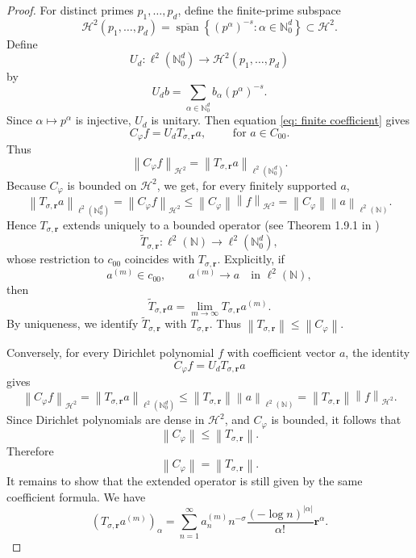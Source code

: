 \documentclass[12pt, reqno]{amsart}
\numberwithin{equation}{section}
\begin{document}
\begin{proof}
For distinct primes $p_1,\ldots,p_d$, define the finite-prime subspace
\[
\mathcal{H}^{2}(p_1,\ldots,p_d)
=
\overline{\operatorname{span}}
\left\{
(p^{\alpha})^{-s}:\alpha\in\mathbb{N}_{0}^{d}
\right\}
\subset \mathcal{H}^{2}.
\]
Define
\[
U_d:\ell^2(\mathbb{N}_{0}^{d})\to \mathcal{H}^{2}(p_1,\ldots,p_d)
\]
by
\[
U_d b
=
\sum_{\alpha\in\mathbb{N}_{0}^{d}}b_{\alpha}(p^{\alpha})^{-s}.
\]
Since $\alpha\mapsto p^{\alpha}$ is injective, \(U_d\) is unitary.
%
Then equation  \eqref{eq: finite coefficient} gives
\[
C_{\varphi}f
=
U_dT_{\sigma,\boldsymbol{r}}a, \qquad \text{ for } a\in C_{00}.
\]
Thus \[
\left\|C_{\varphi}f\right\|_{\mathcal{H}^{2}}
=
\left\|T_{\sigma,\boldsymbol{r}}a\right\|_{\ell^2(\mathbb{N}_{0}^{d})}.
\]
Because \(C_{\varphi}\) is bounded on \(\mathcal{H}^{2}\), we get, for every finitely supported \(a\),
\[
\left\|T_{\sigma,\boldsymbol{r}}a\right\|_{\ell^2(\mathbb{N}_{0}^{d})}
=
\left\|C_{\varphi}f\right\|_{\mathcal{H}^{2}}
\leq
\left\|C_{\varphi}\right\|\left\|f\right\|_{\mathcal{H}^{2}}
=
\left\|C_{\varphi}\right\|\left\|a\right\|_{\ell^2(\mathbb{N})}.
\]
Hence \(T_{\sigma,\boldsymbol{r}}\) extends uniquely to a bounded operator (see Theorem 1.9.1 in \cite{RM})
\[
\widetilde{T}_{\sigma,\boldsymbol{r}}:\ell^2(\mathbb{N})\to\ell^2(\mathbb{N}_{0}^{d}),
\]
whose restriction to $c_{00}$ coincides with $T_{\sigma,\boldsymbol{r}}$.
Explicitly, if
\[
a^{(m)}\in c_{00},
\qquad
a^{(m)}\rightarrow a
\quad\text{in }\ell^2(\mathbb N),
\]
then
\[
\widetilde T_{\sigma,\boldsymbol{r}}a
=
\lim_{m\rightarrow\infty}
T_{\sigma,\boldsymbol{r}}a^{(m)}.
\]
By uniqueness, we identify $\widetilde T_{\sigma,\boldsymbol{r}}$ with
$T_{\sigma,\boldsymbol{r}}$.
Thus
$\left\|T_{\sigma,\boldsymbol{r}}\right\|
\leq
\left\|C_{\varphi}\right\|.$

Conversely, for every Dirichlet polynomial \(f\) with coefficient vector \(a\), the identity
\[
C_{\varphi}f
=
U_dT_{\sigma,\boldsymbol{r}}a
\]
gives
\[
\left\|C_{\varphi}f\right\|_{\mathcal{H}^{2}}
=
\left\|T_{\sigma,\boldsymbol{r}}a\right\|_{\ell^2(\mathbb{N}_{0}^{d})}
\leq
\left\|T_{\sigma,\boldsymbol{r}}\right\|
\left\|a\right\|_{\ell^2(\mathbb{N})}
=
\left\|T_{\sigma,\boldsymbol{r}}\right\|
\left\|f\right\|_{\mathcal{H}^{2}}.
\]
Since Dirichlet polynomials are dense in \(\mathcal{H}^{2}\), and  \(C_{\varphi}\) is bounded, it follows that
\[
\left\|C_{\varphi}\right\|
\leq
\left\|T_{\sigma,\boldsymbol{r}}\right\|.
\]
Therefore
\[
\left\|C_{\varphi}\right\|
=
\left\|T_{\sigma,\boldsymbol{r}}\right\|.
\]
It remains to show that the extended operator is still given by the same coefficient formula. We have
\[
(T_{\sigma,\boldsymbol{r}}a^{(m)})_\alpha
=
\sum_{n=1}^{\infty}
a_n^{(m)}
n^{-\sigma}
\frac{(-\log n)^{|\alpha|}}{\alpha!}
\boldsymbol{r}^\alpha.
\]


\end{proof}
\end{document}
